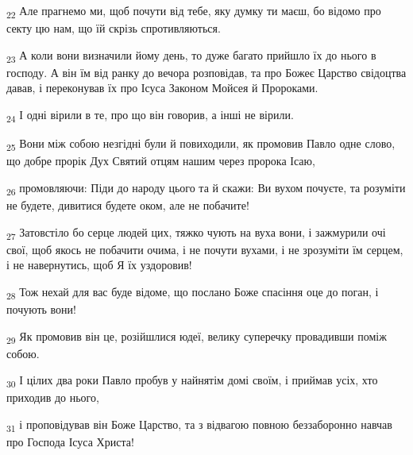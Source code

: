 \begin{tcolorbox}
\textsubscript{22} Але прагнемо ми, щоб почути від тебе, яку думку ти маєш, бо відомо про секту цю нам, що їй скрізь спротивляються.
\end{tcolorbox}
\begin{tcolorbox}
\textsubscript{23} А коли вони визначили йому день, то дуже багато прийшло їх до нього в господу. А він їм від ранку до вечора розповідав, та про Божеє Царство свідоцтва давав, і переконував їх про Ісуса Законом Мойсея й Пророками.
\end{tcolorbox}
\begin{tcolorbox}
\textsubscript{24} І одні вірили в те, про що він говорив, а інші не вірили.
\end{tcolorbox}
\begin{tcolorbox}
\textsubscript{25} Вони між собою незгідні були й повиходили, як промовив Павло одне слово, що добре прорік Дух Святий отцям нашим через пророка Ісаю,
\end{tcolorbox}
\begin{tcolorbox}
\textsubscript{26} промовляючи: Піди до народу цього та й скажи: Ви вухом почуєте, та розуміти не будете, дивитися будете оком, але не побачите!
\end{tcolorbox}
\begin{tcolorbox}
\textsubscript{27} Затовстіло бо серце людей цих, тяжко чують на вуха вони, і зажмурили очі свої, щоб якось не побачити очима, і не почути вухами, і не зрозуміти їм серцем, і не навернутись, щоб Я їх уздоровив!
\end{tcolorbox}
\begin{tcolorbox}
\textsubscript{28} Тож нехай для вас буде відоме, що послано Боже спасіння оце до поган, і почують вони!
\end{tcolorbox}
\begin{tcolorbox}
\textsubscript{29} Як промовив він це, розійшлися юдеї, велику суперечку провадивши поміж собою.
\end{tcolorbox}
\begin{tcolorbox}
\textsubscript{30} І цілих два роки Павло пробув у найнятім домі своїм, і приймав усіх, хто приходив до нього,
\end{tcolorbox}
\begin{tcolorbox}
\textsubscript{31} і проповідував він Боже Царство, та з відвагою повною беззаборонно навчав про Господа Ісуса Христа!
\end{tcolorbox}
